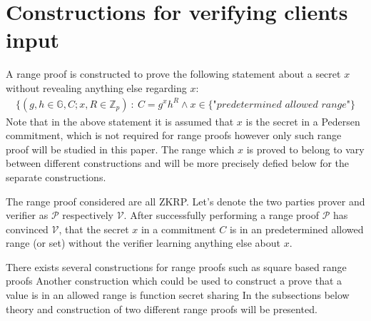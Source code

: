 

\section{Constructions for verifying clients input}
\label{sec:RF_theory}
A range proof is constructed to prove the following statement about a secret $x$ without revealing anything else regarding $x$:
\begin{align*}
    \{(g,h\in\mathds{G},C;x,R\in\mathds{Z}_p)\::\:C= g^x h^R \wedge x \in \{\textit{"predetermined allowed range"}\}
\end{align*}
Note that in the above statement  it is assumed that $x$ is the secret in a Pedersen commitment, which is not required for range proofs however only such range proof will be studied in this paper. The range which $x$ is proved to belong to vary between different constructions and will be more precisely defied below for the separate constructions. 

The range proof considered are all ZKRP.  Let's denote the two parties prover and verifier as  $\mathcal{P}$ respectively $\mathcal{V}$. After successfully performing a range proof  $\mathcal{P}$ has convinced $\mathcal{V}$, that the secret $x$ in a commitment $C$ is in an predetermined allowed range (or set) without the verifier learning anything else about $x$.

There exists several constructions for  range proofs such as square based range proofs \cite{Efficient_proof_interval} %
Another construction which could be used to construct a prove that a value is in an allowed range is function secret sharing \cite{FSS} %
 In the subsections below theory and construction of two different range proofs will be presented.




